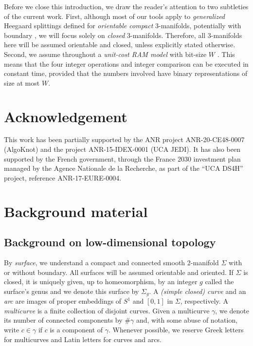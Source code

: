 \documentclass[11pt]{amsart}
\numberwithin{equation}{section}
\theoremstyle{plain}
\theoremstyle{definition}
\begin{document}
Before we close this introduction, we draw the reader's attention to two subtleties of the current work. 
First, although most of our tools apply to \emph{generalized} Heegaard splittings defined for \emph{orientable compact} 3-manifolds, potentially with boundary \cite{johnson2006notes, schultens2014introduction}, we will focus solely on \emph{closed} 3-manifolds. 
Therefore, all 3-manifolds here will be assumed orientable and closed, unless explicitly stated otherwise. 
Second, we assume throughout a \textit{unit-cost RAM model} with bit-size $W$ \cite{hagerup1998sorting}. 
This means that the four integer operations and integer comparison can be executed in constant time, provided that the numbers involved have binary representations of size at most $W$.
 

\section*{Acknowledgement} This work has been partially supported by the ANR project ANR-20-CE48-0007 (AlgoKnot) and the project ANR-15-IDEX-0001 (UCA JEDI). It has also been supported by the French government, through the France 2030 investment plan managed by the Agence Nationale de la Recherche, as part of the ``UCA DS4H'' project, reference ANR-17-EURE-0004.

\section{Background material}\label{sec: background} 
\subsection{Background on low-dimensional topology}\label{sec: background topology}
By \textit{surface}, we understand a compact and connected smooth 2-manifold $\Sigma$ with or without boundary.
All surfaces will be assumed orientable and oriented. 
If $\Sigma$ is closed, it is uniquely given, up to homeomorphism, by an integer $g$ called the surface's genus \cite{farb2011primer} and we denote this surface by $\Sigma_g$. 
A \textit{(simple closed) curve} and an \emph{arc} are images of proper embeddings of $S^1$ and $[0,1]$ in $\Sigma$, respectively. 
A \textit{multicurve} is a finite collection of disjoint curves. 
Given a multicurve $\gamma$, we denote its number of connected components by $\#\gamma$ and, with some abuse of notation, write $c\in \gamma$ if $c$ is a component of $\gamma$. 
Whenever possible, we reserve Greek letters for multicurves and Latin letters for curves and arcs.
\end{document}

